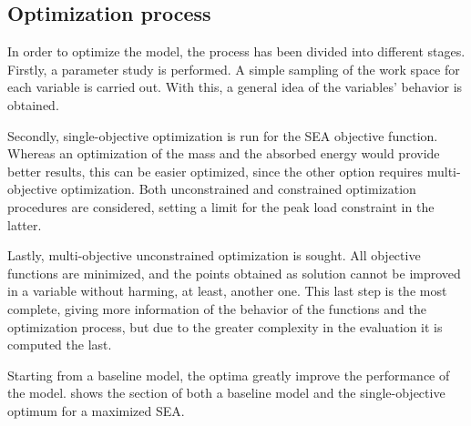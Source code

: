 \documentclass[cmfonts]{witpress}
\begin{document}


\subsection{Optimization process}

In order to optimize the model, the process has been divided into different stages. Firstly, a parameter study is performed. A simple sampling of the work space for each variable is carried out. With this, a general idea of the variables' behavior is obtained.

Secondly, single-objective optimization is run for the SEA objective function. Whereas an optimization of the mass and the absorbed energy would provide better results, this can be easier optimized, since the other option requires multi-objective optimization. Both unconstrained and constrained optimization procedures are considered, setting a limit for the peak load constraint in the latter.

Lastly, multi-objective unconstrained optimization is sought. All objective functions are minimized, and the points obtained as solution cannot be improved in a variable without harming, at least, another one. This last step is the most complete, giving more information of the behavior of the functions and the optimization process, but due to the greater complexity in the evaluation it is computed the last.

Starting from a baseline model, the optima greatly improve the performance of the model.  shows the section of both a baseline model and the single-objective optimum for a maximized SEA. 
\end{document}
